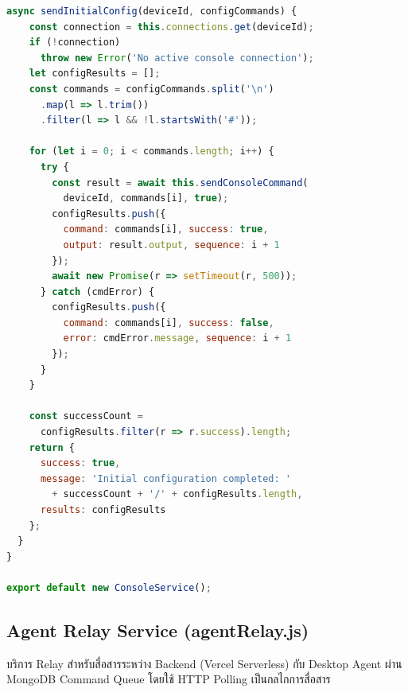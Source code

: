 \begin{lstlisting}[language=JavaScript, caption={services/consoleService.js -- Console Service}]
  async sendInitialConfig(deviceId, configCommands) {
    const connection = this.connections.get(deviceId);
    if (!connection)
      throw new Error('No active console connection');
    let configResults = [];
    const commands = configCommands.split('\n')
      .map(l => l.trim())
      .filter(l => l && !l.startsWith('#'));

    for (let i = 0; i < commands.length; i++) {
      try {
        const result = await this.sendConsoleCommand(
          deviceId, commands[i], true);
        configResults.push({
          command: commands[i], success: true,
          output: result.output, sequence: i + 1
        });
        await new Promise(r => setTimeout(r, 500));
      } catch (cmdError) {
        configResults.push({
          command: commands[i], success: false,
          error: cmdError.message, sequence: i + 1
        });
      }
    }

    const successCount =
      configResults.filter(r => r.success).length;
    return {
      success: true,
      message: 'Initial configuration completed: '
        + successCount + '/' + configResults.length,
      results: configResults
    };
  }
}

export default new ConsoleService();
\end{lstlisting}

\subsection{Agent Relay Service (agentRelay.js)}
\hspace*{1.3em}
บริการ Relay สำหรับสื่อสารระหว่าง Backend (Vercel Serverless) กับ Desktop Agent ผ่าน MongoDB Command Queue โดยใช้ HTTP Polling เป็นกลไกการสื่อสาร

